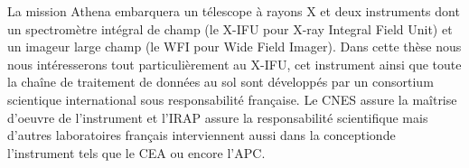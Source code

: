 \documentclass[12pt,a4paper]{report}
\begin{document}
La mission Athena embarquera un télescope à rayons X et deux instruments dont un spectromètre intégral de champ (le X-IFU pour X-ray Integral Field Unit) et un imageur large champ (le WFI pour Wide Field Imager). Dans cette thèse nous nous intéresserons tout particulièrement au X-IFU, cet instrument ainsi que toute la chaîne de traitement de données au sol sont développés par un consortium scientique international sous responsabilité française. Le CNES assure la maîtrise d'oeuvre de l'instrument et l'IRAP assure la responsabilité scientifique mais d'autres laboratoires français interviennent aussi dans la conceptionde l'instrument tels que le CEA ou encore l'APC.
\end{document}
